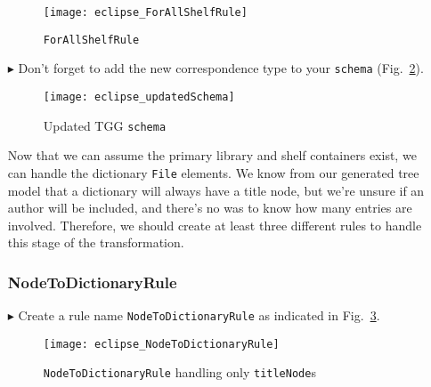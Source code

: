 \begin{itemize}
\vspace{0.5cm}

\begin{figure}[htbp]
\begin{center}
  \texttt{[image: eclipse\_ForAllShelfRule]}
  \caption{\texttt{ForAllShelfRule}}
  \label{eclipse:ForAllShelvesRule}
\end{center}
\end{figure}

\item[$\blacktriangleright$] Don't forget to add the new correspondence type to your \texttt{schema} (Fig.~\ref{eclipse:updatedSchema}).

\vspace{0.5cm}

\begin{figure}[h!]
\begin{center}
  \texttt{[image: eclipse\_updatedSchema]}
  \caption{Updated TGG \texttt{schema}}
  \label{eclipse:updatedSchema}
\end{center}
\end{figure}

\newpage

Now that we can assume the primary library and shelf containers exist, we can handle the dictionary \texttt{File} elements. We know from our generated
tree model that a dictionary will always have a title node, but we're unsure if an author will be included, and there's no was to know how many entries are
involved. Therefore, we should create at least three different rules to handle this stage of the transformation. 

\subsubsection{NodeToDictionaryRule} %

\item[$\blacktriangleright$] Create a rule name \texttt{NodeToDictionaryRule} as indicated in Fig.~\ref{eclipse:NodeToDictionaryRule}.

\vspace{0.5cm}

\begin{figure}[htbp]
\begin{center}
  \texttt{[image: eclipse\_NodeToDictionaryRule]}
  \caption{\texttt{NodeToDictionaryRule} handling only \texttt{titleNode}s}
  \label{eclipse:NodeToDictionaryRule}
\end{center}
\end{figure}


\end{itemize}
